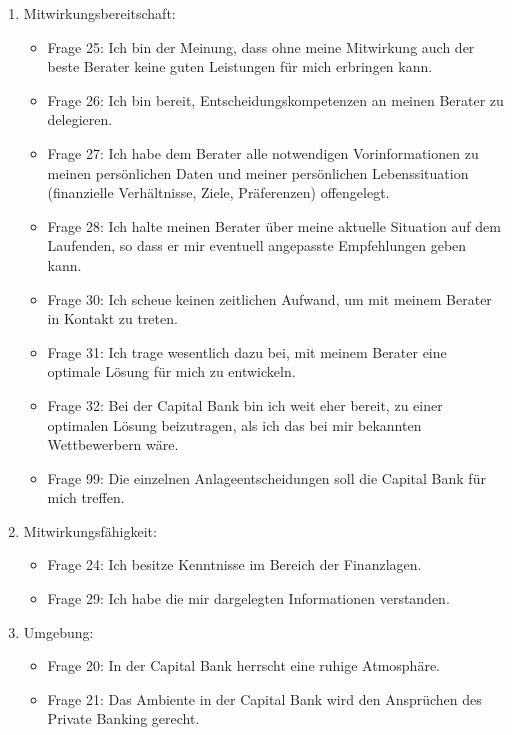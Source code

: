 \documentclass{article}\usepackage[]{graphicx}\usepackage[]{color}
\begin{document}
\begin{enumerate}
        \item Mitwirkungsbereitschaft:
    \begin{itemize}
    \item Frage 25:
    Ich bin der Meinung, dass ohne meine Mitwirkung auch der beste Berater keine guten Leistungen für mich erbringen kann.
    \item Frage 26:
    Ich bin bereit, Entscheidungskompetenzen an meinen Berater zu delegieren.
    \item Frage 27:
    Ich habe dem Berater alle notwendigen Vorinformationen zu meinen persönlichen Daten und meiner persönlichen Lebenssituation (finanzielle Verhältnisse, Ziele, Präferenzen) offengelegt.
    \item Frage 28:
    Ich halte meinen Berater über meine aktuelle Situation auf dem Laufenden, so dass er mir eventuell angepasste Empfehlungen geben kann.
    \item Frage 30:
    Ich scheue keinen zeitlichen Aufwand, um mit meinem Berater in Kontakt zu treten.
    \item Frage 31:
    Ich trage wesentlich dazu bei, mit meinem Berater eine optimale Lösung für mich zu entwickeln.
    \item Frage 32:
    Bei der Capital Bank bin ich weit eher bereit, zu einer optimalen Lösung beizutragen, als ich das bei mir bekannten Wettbewerbern wäre.
    \item Frage 99:
    Die einzelnen Anlageentscheidungen soll die Capital Bank für mich treffen.
    \end{itemize}
    


        \item Mitwirkungsfähigkeit:
    \begin{itemize}
    \item Frage 24:
    Ich besitze Kenntnisse im Bereich der Finanzlagen.
    \item Frage 29:
    Ich habe die mir dargelegten Informationen verstanden.
    \end{itemize}
    
        \item Umgebung:
    \begin{itemize}
    \item Frage 20:
    In der Capital Bank herrscht eine ruhige Atmosphäre.
    \item Frage 21:
    Das Ambiente in der Capital Bank wird den Ansprüchen des Private Banking gerecht.
    \end{itemize}
    

\end{enumerate}
\end{document}
